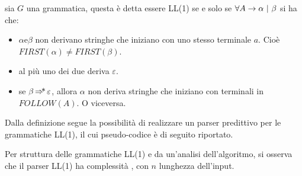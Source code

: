 \documentclass{subfiles}
\begin{document}
\begin{Definition*}
    sia $G$ una grammatica, questa è detta essere LL(1) se e solo se $\forall \Grammar{A}{\alpha}[\beta]$ si ha che:
    \begin{itemize}
        \item $\alpha \text{e} \beta$ non derivano stringhe che iniziano con uno stesso terminale $a$.
              Cioè $FIRST(\alpha) \neq FIRST(\beta)$.
        \item al più uno dei due deriva $\varepsilon$.
        \item se $\beta \operatorname{\Rightarrow\hspace{-5pt}*} \varepsilon$, allora $\alpha$ non deriva stringhe che iniziano con terminali in $FOLLOW(A)$. O viceversa.
    \end{itemize}
\end{Definition*}

Dalla definizione segue la possibilità di realizzare un parser predittivo per le grammatiche LL(1), il cui pseudo-codice è di seguito riportato.

Per struttura delle grammatiche LL(1) e da un'analisi dell'algoritmo, si osserva che il parser LL(1) ha complessità ,
con $n$ lunghezza dell'input.
\end{document}
